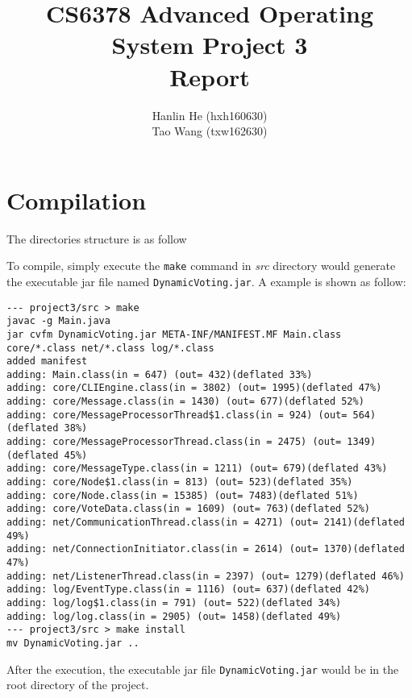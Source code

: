 \documentclass[12pt,letterpaper,en-US]{article}
\title{CS6378 Advanced Operating System Project 3 \\Report}
\author{Hanlin He (hxh160630)\\Tao Wang (txw162630)}
\begin{document}
\maketitle
\tableofcontents


\section{Compilation}

The directories structure is as follow



To compile, simply execute the \texttt{make} command in \emph{src} directory would generate the executable jar file named \texttt{DynamicVoting.jar}. A example is shown as follow:

\begin{lstlisting}
--- project3/src > make
javac -g Main.java
jar cvfm DynamicVoting.jar META-INF/MANIFEST.MF Main.class core/*.class net/*.class log/*.class
added manifest
adding: Main.class(in = 647) (out= 432)(deflated 33%)
adding: core/CLIEngine.class(in = 3802) (out= 1995)(deflated 47%)
adding: core/Message.class(in = 1430) (out= 677)(deflated 52%)
adding: core/MessageProcessorThread$1.class(in = 924) (out= 564)(deflated 38%)
adding: core/MessageProcessorThread.class(in = 2475) (out= 1349)(deflated 45%)
adding: core/MessageType.class(in = 1211) (out= 679)(deflated 43%)
adding: core/Node$1.class(in = 813) (out= 523)(deflated 35%)
adding: core/Node.class(in = 15385) (out= 7483)(deflated 51%)
adding: core/VoteData.class(in = 1609) (out= 763)(deflated 52%)
adding: net/CommunicationThread.class(in = 4271) (out= 2141)(deflated 49%)
adding: net/ConnectionInitiator.class(in = 2614) (out= 1370)(deflated 47%)
adding: net/ListenerThread.class(in = 2397) (out= 1279)(deflated 46%)
adding: log/EventType.class(in = 1116) (out= 637)(deflated 42%)
adding: log/log$1.class(in = 791) (out= 522)(deflated 34%)
adding: log/log.class(in = 2905) (out= 1458)(deflated 49%)
--- project3/src > make install
mv DynamicVoting.jar ..
\end{lstlisting}

After the execution, the executable jar file \texttt{DynamicVoting.jar} would be in the root directory of the project.
\end{document}
